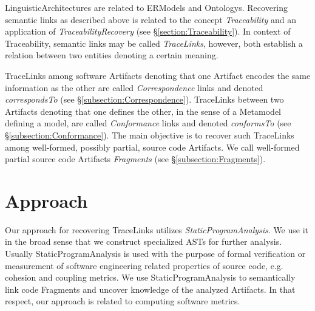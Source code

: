 \Glspl{LinguisticArchitecture} are related to \glspl{ERModel} and \glspl{Ontology}.
Recovering semantic links as described above is related to the concept \textit{\gls{Traceability}} and an application of \textit{\gls{TraceabilityRecovery}} \cite{DBLP:books/daglib/p/GotelCHZEGDAMM12} (see §\ref{section:Traceability}).
In context of \gls{Traceability}, semantic links may be called \textit{\glspl{TraceLink}}, however, both establish a relation between two entities denoting a certain meaning.

\Glspl{TraceLink} among software \glspl{Artifact} denoting that one \gls{Artifact} encodes the same information as the other are called \textit{\gls{Correspondence}} links and denoted \textit{correspondsTo} (see §\ref{subsection:Correspondence}).
\Glspl{TraceLink} between two \glspl{Artifact} denoting that one defines the other, in the sense of a \gls{Metamodel} defining a model, are called \textit{\gls{Conformance}} links and denoted \textit{conformsTo} (see §\ref{subsection:Conformance}).
The main objective is to recover such \glspl{TraceLink} among well-formed, possibly partial, source code \glspl{Artifact}.
We call well-formed partial source code \glspl{Artifact} \textit{\glspl{Fragment}} (see §\ref{subsection:Fragments}).
 

\section{Approach}
\label{section:Approach}
Our approach for recovering \glspl{TraceLink} utilizes \textit{\gls{StaticProgramAnalysis}}.
We use it in the broad sense that we construct specialized \glspl{AST} for further analysis.
Usually \gls{StaticProgramAnalysis} is used with the purpose of formal verification or measurement of software engineering related properties of source code, e.g. cohesion and coupling metrics.
We use \gls{StaticProgramAnalysis} to semantically link code \glspl{Fragment} and uncover knowledge of the analyzed \glspl{Artifact}.
In that respect, our approach is related to computing software metrics.

